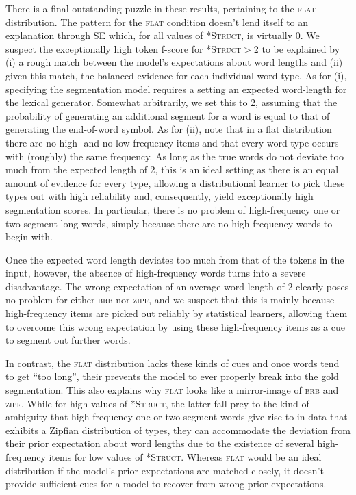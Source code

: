 \documentclass[11pt]{article}
\begin{document}
There is a final outstanding puzzle in these results, pertaining to the \textsc{flat} distribution. The pattern for the \textsc{flat} condition doesn't lend itself to an explanation through SE which, for all values of \textsc{*Struct}, is virtually 0. We suspect the exceptionally high token f-score for \textsc{*Struct}$>$2 to be explained by (i) a rough match between the model's expectations about word lengths and (ii) given this match, the balanced evidence for each individual word type. As for (i), specifying the segmentation model requires a setting an expected word-length for the lexical generator. Somewhat arbitrarily, we set this to 2, assuming that the probability of generating an additional segment for a word is equal to that of generating the end-of-word symbol. As for (ii), note that in a flat distribution there are no high- and no low-frequency items and that every word type occurs with (roughly) the same frequency. As long as the true words do not deviate too much from the expected length of 2, this is an ideal setting as there is an equal amount of evidence for every type, allowing a distributional learner to pick these types out with high reliability and, consequently, yield exceptionally high segmentation scores. In particular, there is no problem of high-frequency one or two segment long words, simply because there are no high-frequency words to begin with.

Once the expected word length deviates too much from that of the tokens in the input, however, the absence of high-frequency words turns into a severe disadvantage. The wrong expectation of an average word-length of 2 clearly poses no problem for either \textsc{brb} nor \textsc{zipf}, and we suspect that this is mainly because high-frequency items are picked out reliably by statistical learners, allowing them to overcome this wrong expectation by using these high-frequency items as a cue to segment out further words. 

In contrast, the \textsc{flat} distribution lacks these kinds of cues and once words tend to get ``too long'', their prevents the model to ever properly break into the gold segmentation. This also explains why \textsc{flat} looks like a mirror-image of \textsc{brb} and \textsc{zipf}. While for high values of \textsc{*Struct}, the latter fall prey to the kind of ambiguity that high-frequency one or two segment words give rise to in data that exhibits a Zipfian distribution of types, they can accommodate the deviation from their prior expectation about word lengths due to the existence of several high-frequency items for low values of \textsc{*Struct}. Whereas \textsc{flat} would be an ideal distribution if the model's prior expectations are matched closely, it doesn't provide sufficient cues for a model to recover from wrong prior expectations.
 
\end{document}

